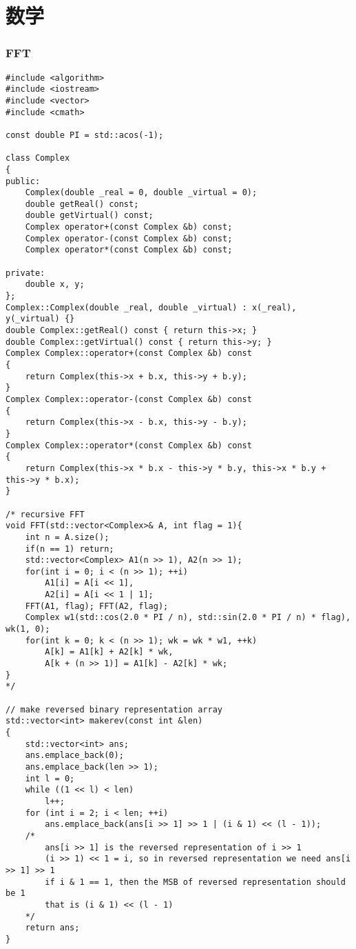 \documentclass{ctexbook}  %
\begin{document}
\chapter{数学}
\subsection{FFT}
\lstset{basicstyle=	tfamily}
\begin{Verbatim}[fontsize=\small]
#include <algorithm>
#include <iostream>
#include <vector>
#include <cmath>

const double PI = std::acos(-1);

class Complex
{
public:
    Complex(double _real = 0, double _virtual = 0);
    double getReal() const;
    double getVirtual() const;
    Complex operator+(const Complex &b) const;
    Complex operator-(const Complex &b) const;
    Complex operator*(const Complex &b) const;

private:
    double x, y;
};
Complex::Complex(double _real, double _virtual) : x(_real), y(_virtual) {}
double Complex::getReal() const { return this->x; }
double Complex::getVirtual() const { return this->y; }
Complex Complex::operator+(const Complex &b) const
{
    return Complex(this->x + b.x, this->y + b.y);
}
Complex Complex::operator-(const Complex &b) const
{
    return Complex(this->x - b.x, this->y - b.y);
}
Complex Complex::operator*(const Complex &b) const
{
    return Complex(this->x * b.x - this->y * b.y, this->x * b.y + this->y * b.x);
}

/* recursive FFT
void FFT(std::vector<Complex>& A, int flag = 1){
    int n = A.size();
    if(n == 1) return;
    std::vector<Complex> A1(n >> 1), A2(n >> 1);
    for(int i = 0; i < (n >> 1); ++i)
        A1[i] = A[i << 1],
        A2[i] = A[i << 1 | 1];
    FFT(A1, flag); FFT(A2, flag);
    Complex w1(std::cos(2.0 * PI / n), std::sin(2.0 * PI / n) * flag), wk(1, 0);
    for(int k = 0; k < (n >> 1); wk = wk * w1, ++k)
        A[k] = A1[k] + A2[k] * wk,
        A[k + (n >> 1)] = A1[k] - A2[k] * wk;
}
*/

// make reversed binary representation array
std::vector<int> makerev(const int &len)
{
    std::vector<int> ans;
    ans.emplace_back(0);
    ans.emplace_back(len >> 1);
    int l = 0;
    while ((1 << l) < len)
        l++;
    for (int i = 2; i < len; ++i)
        ans.emplace_back(ans[i >> 1] >> 1 | (i & 1) << (l - 1));
    /*
        ans[i >> 1] is the reversed representation of i >> 1
        (i >> 1) << 1 = i, so in reversed representation we need ans[i >> 1] >> 1
        if i & 1 == 1, then the MSB of reversed representation should be 1
        that is (i & 1) << (l - 1)
    */
    return ans;
}


\end{Verbatim}
\end{document}
